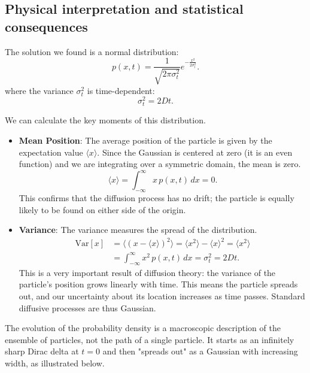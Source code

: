 \subsection{Physical interpretation and statistical consequences}
The solution we found is a  normal distribution:
\begin{equation}
p(x,t) = \frac{1}{\sqrt{2\pi\sigma_t^2}} e^{-\frac{x^2}{2\sigma_t^2}}.
\end{equation}
where the variance $\sigma_t^2$ is time-dependent:
\begin{equation}
\sigma_t^2 = 2Dt.
\end{equation}


We can calculate the key moments of this distribution.
\begin{itemize}
    \item \textbf{Mean Position}: The average position of the particle is given by the expectation value $\langle x \rangle$. Since the Gaussian is centered at zero (it is an even function) and we are integrating over a symmetric domain, the mean is zero.
    \begin{equation}
    \langle x \rangle = \int_{-\infty}^{\infty} x \, p(x,t) \,dx = 0.
    \end{equation}
    This confirms that the diffusion process has no drift; the particle is equally likely to be found on either side of the origin.

    \item \textbf{Variance}: The variance measures the spread of the distribution.
    \begin{equation}\begin{split}
        \text{Var}[x] &= \langle (x - \langle x \rangle)^2 \rangle = \langle x^2 \rangle - \langle x \rangle^2 = \langle x^2 \rangle \\
        &= \int_{-\infty}^{\infty} x^2 \, p(x,t) \,dx = \sigma_t^2 = 2Dt.
    \end{split}\end{equation}
    This is a very important result of diffusion theory: the variance of the particle's position grows linearly with time. This means the particle spreads out, and our uncertainty about its location increases as time passes. Standard diffusive processes are thus Gaussian.
\end{itemize}

The evolution of the probability density is a macroscopic description of the ensemble of particles, not the path of a single particle. It starts as an infinitely sharp Dirac delta at $t=0$ and then "spreads out" as a Gaussian with increasing width, as illustrated below.

